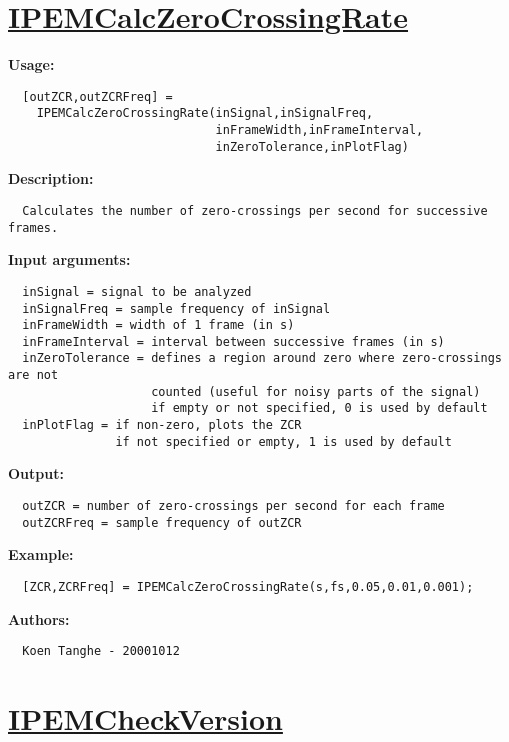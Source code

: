\newpage
\section*{\hyperlink{Concepts:IPEMCalcZeroCrossingRate}{IPEMCalcZeroCrossingRate}}
\hypertarget{FuncRef:IPEMCalcZeroCrossingRate}{}

\textbf{Usage:}
\begin{verbatim}  [outZCR,outZCRFreq] = 
    IPEMCalcZeroCrossingRate(inSignal,inSignalFreq,
                             inFrameWidth,inFrameInterval,
                             inZeroTolerance,inPlotFlag)

\end{verbatim}
\textbf{Description:}
\begin{verbatim}  Calculates the number of zero-crossings per second for successive frames.

\end{verbatim}
\textbf{Input arguments:}
\begin{verbatim}  inSignal = signal to be analyzed
  inSignalFreq = sample frequency of inSignal
  inFrameWidth = width of 1 frame (in s)
  inFrameInterval = interval between successive frames (in s)
  inZeroTolerance = defines a region around zero where zero-crossings are not
                    counted (useful for noisy parts of the signal)
                    if empty or not specified, 0 is used by default
  inPlotFlag = if non-zero, plots the ZCR
               if not specified or empty, 1 is used by default

\end{verbatim}
\textbf{Output:}
\begin{verbatim}  outZCR = number of zero-crossings per second for each frame
  outZCRFreq = sample frequency of outZCR

\end{verbatim}
\textbf{Example:}
\begin{verbatim}  [ZCR,ZCRFreq] = IPEMCalcZeroCrossingRate(s,fs,0.05,0.01,0.001);

\end{verbatim}
\textbf{Authors:}
\begin{verbatim}  Koen Tanghe - 20001012
\end{verbatim}


\newpage
\section*{\hyperlink{Concepts:IPEMCheckVersion}{IPEMCheckVersion}}
\hypertarget{FuncRef:IPEMCheckVersion}{}

